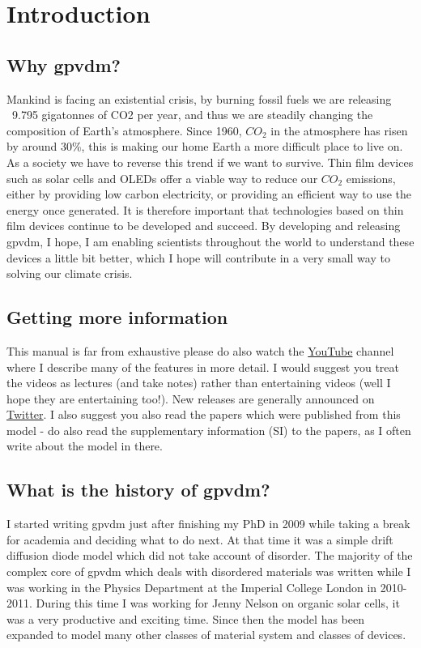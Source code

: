 \section{Introduction}
\subsection{Why gpvdm?}
Mankind is facing an existential crisis, by burning fossil fuels we are releasing ~9.795 gigatonnes of CO2 per year, and thus we are steadily changing the composition of Earth's atmosphere. Since 1960, $CO_{2}$ in the atmosphere has risen by around 30\%, this is making our home Earth a more difficult place to live on. As a society we have to reverse this trend if we want to survive. Thin film devices such as solar cells and OLEDs offer a viable way to reduce our $CO_{2}$ emissions, either by providing low carbon electricity, or providing an efficient way to use the energy once generated. It is therefore important that technologies based on thin film devices continue to be developed and succeed. By developing and releasing gpvdm, I hope, I am enabling scientists throughout the world to understand these devices a little bit better, which I hope will contribute in a very small way to solving our climate crisis. 

\subsection{Getting more information}
This manual is far from exhaustive please do also watch the \href{https://www.youtube.com/channel/UCbm_0AKX1SpbMMT7jilxFfA}{YouTube} channel where I describe many of the features in more detail. I would suggest you treat the videos as lectures (and take notes) rather than entertaining videos (well I hope they are entertaining too!). New releases are generally announced on \href{https://twitter.com/gpvdm_info}{Twitter}.  I also suggest you also read the papers which were published from this model - do also read the supplementary information (SI) to the papers, as I often write about the model in there.

\subsection{What is the history of gpvdm?}
I started writing gpvdm just after finishing my PhD in 2009 while taking a break for academia and deciding what to do next. At that time it was a simple drift diffusion diode model which did not take account of disorder. The majority of the complex core of gpvdm which deals with disordered materials was written while I was working in the Physics Department at the Imperial College London in 2010-2011. During this time I was working for Jenny Nelson on organic solar cells, it was a very productive and exciting time. Since then the model has been expanded to model many other classes of material system and classes of devices.

